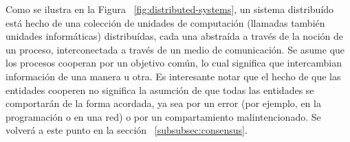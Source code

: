 Como se ilustra en la Figura ~\ref{fig:distributed-systems}, un sistema distribuído está hecho de una
colección de unidades de computación (llamadas también unidades informáticas) distribuídas, cada una
abstraída a través de la noción de un proceso, interconectada a través de un medio de comunicación.
Se asume que los procesos cooperan por un objetivo común, lo cual significa que intercambian
información de una manera u otra. Es interesante notar que el hecho de que las entidades
cooperen no significa la asumción de que todas las entidades se comportarán de la forma
acordada, ya sea por un error (por ejemplo, en la programación o en una red) o por un compartamiento
malintencionado. Se volverá a este punto en la sección ~\ref{subsubsec:consensus}.


